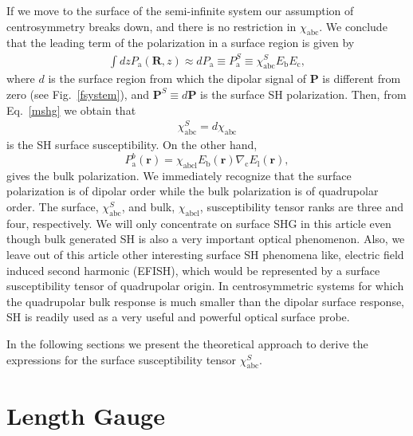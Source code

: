 If we move to the surface of the semi-infinite system our assumption 
of centrosymmetry breaks down, and there is no restriction in 
$\chi_{\mathrm{abc}}$. We conclude that the leading term
of the polarization in a surface region is given by
\begin{align}\label{sshgp1}
\int dz 
P_{\mathrm{a}}(\mathbf{R},z)
\approx dP_{\mathrm{a}}
\equiv
P_{\mathrm{a}}^S
\equiv
\chi^S_{\mathrm{abc}}E_{\mathrm{b}}E_{\mathrm{c}},
\end{align}
where
$d$ is the
surface region from which the dipolar signal of $\mathbf{P}$ is
different from zero (see Fig.~\ref{fsystem}), and
$\mathbf{P}^S\equiv d\mathbf{P}$
 is the surface SH polarization. Then, from Eq.~\eqref{mshg} we obtain that
\begin{align}\label{sshgp2}
\chi_{\mathrm{abc}}^S=d\chi_{\mathrm{abc}}
\end{align}
is the
SH surface susceptibility. 
On the other hand, 
\begin{equation}\label{sshgp3}
P^b_{\mathrm{a}}(\mathbf{r})=\chi_{\mathrm{abc}\mathrm{l}}E_{\mathrm{b}}(\mathbf{r})\nabla_{\mathrm{c}}
E_{\mathrm{l}}(\mathbf{r}),  
\end{equation}
gives the bulk polarization. We immediately recognize that the surface
polarization is of dipolar order while the bulk polarization is of
quadrupolar order. The surface, $\chi^S_{\mathrm{abc}}$, and bulk, 
$\chi_{\mathrm{abc}\mathrm{l}}$, susceptibility tensor ranks are three and 
four, respectively. We will only concentrate on surface SHG in this article 
even though bulk generated SH is also a very important optical phenomenon. 
Also, we leave out of this article other interesting surface SH phenomena like, electric field
induced second harmonic (EFISH), which would be represented by a
surface susceptibility  tensor of quadrupolar origin.
In centrosymmetric systems for which the quadrupolar bulk
response is much smaller than the dipolar surface response, SH is
readily used as a very useful and powerful 
optical surface probe.\cite{downerSIA01}

In the following sections we present the theoretical approach to
derive
the expressions for the 
surface susceptibility tensor $\chi^S_{\mathrm{abc}}$.

\section{Length Gauge}\label{longi}

